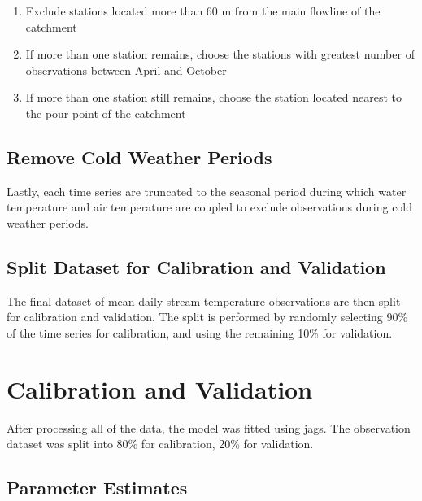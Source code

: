 \documentclass[]{book}
\providecommand{\tightlist}{%
  \setlength{\itemsep}{0pt}\setlength{\parskip}{0pt}}
\begin{document}
\begin{enumerate}
\def\labelenumi{\arabic{enumi}.}
\tightlist
\item
  Exclude stations located more than 60 m from the main flowline of the catchment
\item
  If more than one station remains, choose the stations with greatest number of observations between April and October
\item
  If more than one station still remains, choose the station located nearest to the pour point of the catchment
\end{enumerate}

\hypertarget{remove-cold-weather-periods}{%
\section{Remove Cold Weather Periods}\label{remove-cold-weather-periods}}

Lastly, each time series are truncated to the seasonal period during which water temperature and air temperature are coupled to exclude observations during cold weather periods.

\hypertarget{split-dataset-for-calibration-and-validation}{%
\section{Split Dataset for Calibration and Validation}\label{split-dataset-for-calibration-and-validation}}

The final dataset of mean daily stream temperature observations are then split for calibration and validation. The split is performed by randomly selecting 90\% of the time series for calibration, and using the remaining 10\% for validation.

\hypertarget{calibration-and-validation}{%
\chapter{Calibration and Validation}\label{calibration-and-validation}}

After processing all of the data, the model was fitted using jags. The observation dataset was split into 80\% for calibration, 20\% for validation.

\hypertarget{parameter-estimates}{%
\section{Parameter Estimates}\label{parameter-estimates}}
\end{document}
